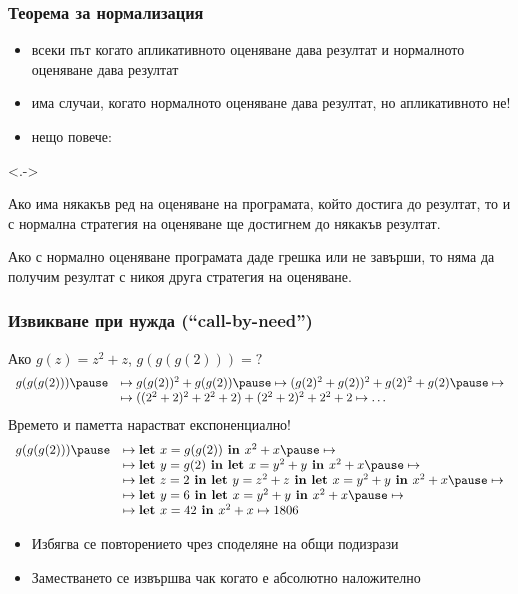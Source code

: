 \documentclass{beamer}
\begin{document}
\begin{frame}
  \frametitle{Теорема за нормализация}
  \begin{itemize}[<+->]
  \item всеки път когато апликативното оценяване дава резултат и нормалното оценяване дава резултат
  \item има случаи, когато нормалното оценяване дава резултат, но апликативното не!
  \item нещо повече:
  \end{itemize}
  \onslide<.->
  \begin{theorem}
    Ако има някакъв ред на оценяване на програмата, който достига до резултат, то и с нормална стратегия на оценяване ще достигнем до някакъв резултат.
  \end{theorem}
  \onslide<+->
  \begin{corollary}
    Ако с нормално оценяване програмата даде грешка или не завърши, то няма да получим резултат с \alert{никоя друга стратегия на оценяване}.
  \end{corollary}
\end{frame}

\begin{frame}
  \frametitle{Извикване при нужда (``call-by-need'')}

Ако $g(z) = z^2 + z$, $g(g(g(2))) = ?$
\pause
\begin{equation*}
  \begin{array}{rl}
  g(g(g(2))) \pause &\mapsto g(g(2))^2 + g(g(2)) \pause\mapsto (g(2)^2+ g(2))^2 + g(2)^2 + g(2) \pause\mapsto\\
  &\mapsto ((2^2+2)^2+2^2+2)+(2^2+2)^2 + 2^2+2 \mapsto \ldots
  \end{array}
\end{equation*}\pause
Времето и паметта нарастват експоненциално!\\
\pause
{}
\pause
\begin{equation*}
  \begin{array}{rl}
    g(g(g(2))) \pause &\mapsto \lett{x = g(g(2))}{x^2 + x}\pause \mapsto\\
    &\mapsto \lett{y=g(2)}{\lett{x=y^2+y}{x^2 + x}} \pause \mapsto\\
    &\mapsto \lett{z=2}{\lett{y=z^2+z}{\lett{x=y^2+y}{x^2 + x}}} \pause \mapsto\\
    &\mapsto \lett{y=6}{\lett{x = y^2+y}{x^2 + x}} \pause \mapsto\\
    &\mapsto \lett{x=42}{x^2 + x} \mapsto 1806
  \end{array}
\end{equation*}\pause\vspace{-1.5em}
\begin{itemize}[<+->]
\item Избягва се повторението чрез споделяне на общи подизрази
\item Заместването се извършва чак когато е \alert{абсолютно наложително}
\end{itemize}
\end{frame}
\end{document}
